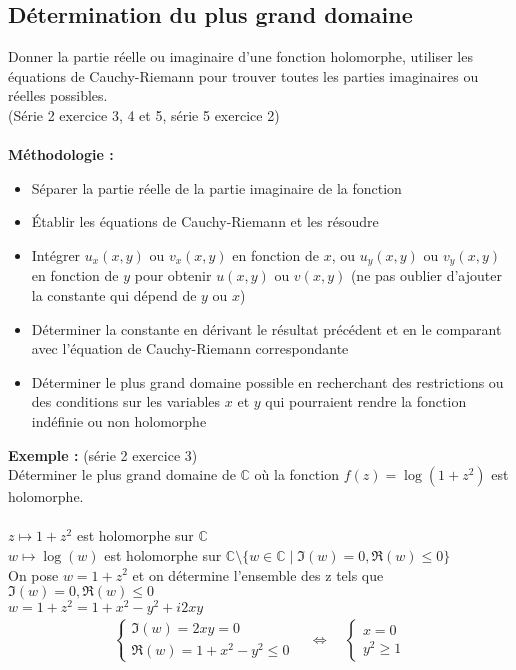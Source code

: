 \subsection{Détermination du plus grand domaine}
Donner la partie réelle ou imaginaire d’une fonction holomorphe, utiliser les équations de Cauchy-Riemann pour trouver toutes les parties imaginaires ou réelles possibles. \\
(Série 2 exercice 3, 4 et 5, série 5 exercice 2) \\
\\
\textbf{Méthodologie :}
\begin{itemize}
    \item Séparer la partie réelle de la partie imaginaire de la fonction
    \item Établir les équations de Cauchy-Riemann et les résoudre 
    \item Intégrer $u_x(x,y)$ ou $v_x(x,y)$ en fonction de $x$, ou $u_y(x,y)$ ou $v_y(x,y)$ en fonction de $y$ pour obtenir $u(x,y)$ ou $v(x,y)$ (ne pas oublier d'ajouter la constante qui dépend de $y$ ou $x$)
    \item Déterminer la constante en dérivant le résultat précédent et en le comparant avec l'équation de Cauchy-Riemann correspondante
    \item Déterminer le plus grand domaine possible en recherchant des restrictions ou des conditions sur les variables $x$ et $y$ qui pourraient rendre la fonction indéfinie ou non holomorphe
\end{itemize}
\textbf{Exemple : }(série 2 exercice 3) \\
Déterminer le plus grand domaine de $\mathbb{C}$ où la fonction $f(z) = \log(1+z^2)$ est holomorphe. \\
\\
$z \mapsto 1+z^2$ est holomorphe sur $\mathbb{C}$ \\
$w \mapsto \log(w)$ est holomorphe sur $\mathbb{C} \setminus \{w \in \mathbb{C} \mid \Im(w) = 0, \Re(w) \leq 0\}$ \\
On pose $w = 1+z^2$ et on détermine l'ensemble des z tels que $\Im(w) = 0, \Re(w) \leq 0$ \\
$w = 1+z^2 = 1 + x^2 -y^2 + i2xy$
\begin{align*}
    \begin{cases}
        \Im(w) = 2xy = 0 \\
        \Re(w) = 1 + x^2 -y^2 \leq 0
    \end{cases}
    \quad
    \Leftrightarrow
    \quad
    \begin{cases}
        x = 0 \\
        y^2 \geq 1
    \end{cases}
\end{align*}
